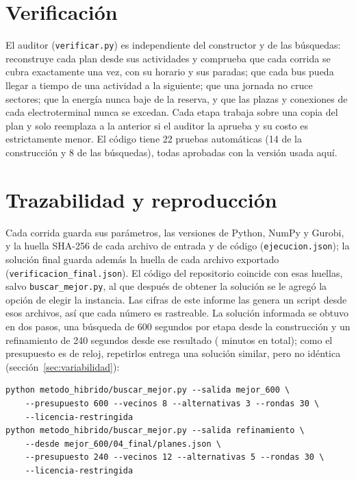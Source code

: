\section{Verificación}
\label{sec:verificacion}

El auditor (\texttt{verificar.py}) es independiente del constructor y de las búsquedas: reconstruye cada plan desde sus actividades y comprueba que cada corrida se cubra exactamente una vez, con su horario y sus paradas; que cada bus pueda llegar a tiempo de una actividad a la siguiente; que una jornada no cruce sectores; que la energía nunca baje de la reserva, y que las plazas y conexiones de cada electroterminal nunca se excedan. Cada etapa trabaja sobre una copia del plan y solo reemplaza a la anterior si el auditor la aprueba y su costo es estrictamente menor. El código tiene 22 pruebas automáticas (14 de la construcción y 8 de las búsquedas), todas aprobadas con la versión usada aquí.

\section{Trazabilidad y reproducción}
\label{sec:reproduccion}

Cada corrida guarda sus parámetros, las versiones de Python, NumPy y Gurobi, y la huella SHA-256 de cada archivo de entrada y de código (\texttt{ejecucion.json}); la solución final guarda además la huella de cada archivo exportado (\texttt{verificacion\_final.json}). El código del repositorio coincide con esas huellas, salvo \texttt{buscar\_mejor.py}, al que después de obtener la solución se le agregó la opción de elegir la instancia. Las cifras de este informe las genera un script desde esos archivos, así que cada número es rastreable. La solución informada se obtuvo en dos pasos, una búsqueda de 600 segundos por etapa desde la construcción y un refinamiento de 240 segundos desde ese resultado (\MinutosRefinado{} minutos en total); como el presupuesto es de reloj, repetirlos entrega una solución similar, pero no idéntica (sección~\ref{sec:variabilidad}):

\begin{small}
\begin{verbatim}
python metodo_hibrido/buscar_mejor.py --salida mejor_600 \
    --presupuesto 600 --vecinos 8 --alternativas 3 --rondas 30 \
    --licencia-restringida
python metodo_hibrido/buscar_mejor.py --salida refinamiento \
    --desde mejor_600/04_final/planes.json \
    --presupuesto 240 --vecinos 12 --alternativas 5 --rondas 30 \
    --licencia-restringida
\end{verbatim}
\end{small}
